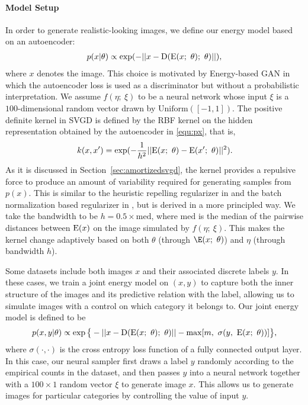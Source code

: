\documentclass{article} \usepackage{iclr2017_conference,times}
\newcommand{\dilincheck}[1]{#1}
\begin{document}
\paragraph{Model Setup} In order to generate realistic-looking images, we define our energy model based on an autoencoder: 
\begin{align}\label{equ:px}
p(x|\theta) \propto \exp(-  || x -   \mathrm{D}(\mathrm{E}(x;~ \theta);~\theta) ||), 
\end{align}
where $x$ denotes the image. 
This choice is motivated by Energy-based GAN \citep{zhao2016energy} in which the autoencoder loss is used as a discriminator but without a probabilistic interpretation. 
We assume $f(\eta;~\xi)$ to be a neural network whose input $\xi$ is a $\dilincheck{100}$-dimensional random vector drawn by $\mathrm{Uniform}([-1,1])$. 
The positive definite kernel in SVGD is defined by the RBF kernel on the hidden representation obtained by the autoencoder in \eqref{equ:px}, that is, 
$$
k(x, x') = \exp(-\frac{1}{h^2} ||\mathrm{E}(x;~\theta) - \mathrm{E}(x';~\theta)||^2). 
$$
As it is discussed in Section~\ref{sec:amortizedsvgd}, the kernel provides a repulsive force 
to produce an amount of variability required for generating samples from $p(x)$. 
This is similar to the heuristic repelling regularizer in \citet{zhao2016energy} and the batch normalization based regularizer in \citet{kim2016deep}, but is derived in a more principled way. 
We take the bandwidth to be $h = \dilincheck{0.5}\times \mathrm{med}$, where $\mathrm{med}$ is the median of the pairwise distances between $\mathrm{E}(x)$ on the image simulated by $f(\eta;~ \xi)$. 
This makes the kernel change adaptively based on both $\theta$ (through $\E(x;~\theta)$) and $\eta$ (through bandwidth $h$). 

Some datasets include both images $x$ and 
their associated discrete labels $y$. In these cases, we train a joint energy model on $(x,y)$ 
to capture both the inner structure of the images and its predictive relation with the label,  allowing us to simulate images 
with a control on which category it belongs to. Our joint energy model is defined to be 
\begin{align}\label{equ:pxy}
p(x, y|\theta) \propto \exp\big \{-  || x -   \mathrm{D}(\mathrm{E}(x;~\theta);~\theta) || - \max[m,~\sigma(y, ~ \mathrm{E}(x;~\theta))]\big \},  \end{align}
where $\sigma(\cdot,\cdot)$ is the cross entropy loss function of a fully connected output layer. 
In this case, our neural sampler first draws a label $y$ randomly according to the empirical counts in the dataset, 
and then passes $y$ into a neural network together with a $100\times 1$ random vector $\xi$ to generate image $x$. 
This allows us to generate images for particular categories by controlling the value of input $y$. 
\end{document}
